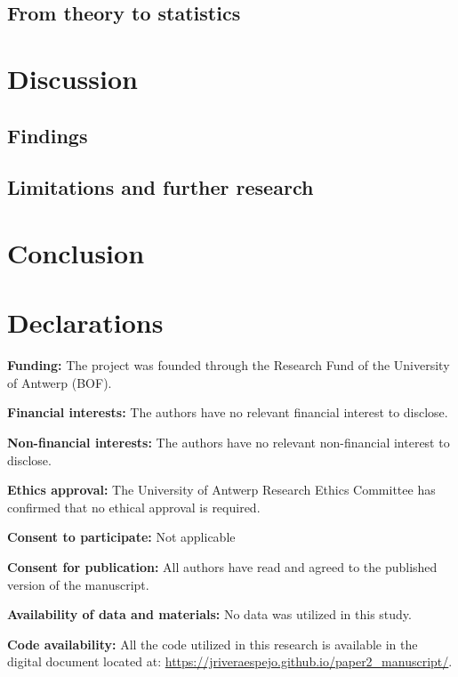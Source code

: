 \documentclass[
  authoryear,
  preprint,
  1p]{elsarticle}
\begin{document}
\subsection{From theory to statistics}\label{sec-theory-statistics}

\section{Discussion}\label{sec-discuss}

\subsection{Findings}\label{sec-discuss-finding}

\subsection{Limitations and further
research}\label{sec-discuss-limitations}

\section{Conclusion}\label{sec-conclusion}

\newpage{}

\section*{Declarations}\label{declarations}

\textbf{Funding:} The project was founded through the Research Fund of
the University of Antwerp (BOF).

\textbf{Financial interests:} The authors have no relevant financial
interest to disclose.

\textbf{Non-financial interests:} The authors have no relevant
non-financial interest to disclose.

\textbf{Ethics approval:} The University of Antwerp Research Ethics
Committee has confirmed that no ethical approval is required.

\textbf{Consent to participate:} Not applicable

\textbf{Consent for publication:} All authors have read and agreed to
the published version of the manuscript.

\textbf{Availability of data and materials:} No data was utilized in
this study.

\textbf{Code availability:} All the code utilized in this research is
available in the digital document located at:
\url{https://jriveraespejo.github.io/paper2_manuscript/}.
\end{document}
